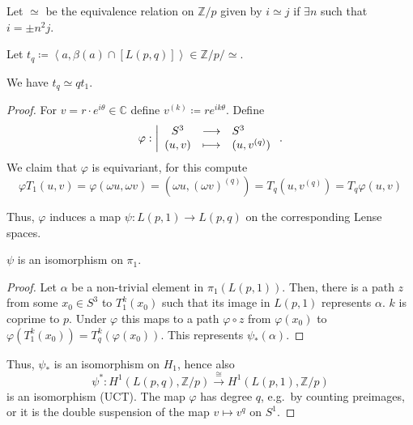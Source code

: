 
Let $\simeq$ be the equivalence relation on $\mathbb{Z}/p$ given by
$i \simeq j$ if $\exists n$ such that $i = \pm n^2 j$.

Let $t_q \coloneqq \left< a, β(a) \cap [L(p,q)] \right> \in \mathbb{Z}/p / \simeq$.

\begin{lemma}
  \label{lm:relation-lense-spaces-t-q-is-q-times-t-1}
  We have $t_q \simeq q t_1$.
\end{lemma}

\begin{proof}
  For $v = r\cdot e^{i\theta} \in \mathbb{C}$ define
  $v^{(k)} \coloneqq re^{ik\theta}$.
  Define
    \begin{equation*}
    \varphi : \left| \begin{array}{c c l} 
    S^3 & \longrightarrow & S^3 \\
    (u,v) & \longmapsto &  (u, v^{(q)})
    \end{array} \right.
    .
  \end{equation*}
  We claim that $\varphi $ is equivariant, for this compute
  \[
    \varphi T_1(u,v) = \varphi(\omega u, \omega v)
    =
    (\omega u, (\omega v)^{(q)})
    =
    T_q(u, v^{(q)})
    =
    T_q \varphi (u,v)
  \]

  Thus, $\varphi$ induces a map $\psi \colon  L(p,1) \to L(p,q)$
  on the corresponding Lense spaces.

  \begin{claim}
    $\psi $ is an isomorphism on $\pi_1$.
  \end{claim}
  \begin{proof}
    Let $α$ be a non-trivial element in $\pi_1(L(p,1))$.
    Then, there is a path $z$ from some $x_0\in S^3$ to
    $T_1^k(x_0)$ such that its image in $L(p,1)$
    represents $α$.
    $k$ is coprime to $p$.
    Under $\varphi $ this maps to a path $\varphi \circ z$
    from $\varphi (x_0)$ to $\varphi (T_1^k(x_0)) = T_q^k(\varphi (x_0))$.
    This represents $\psi _*(α)$.
  \end{proof}
  Thus, $\psi _*$ is an isomorphism on $H_1$,
  hence also
  \[
    \psi ^* \colon  H^1(L(p,q), \mathbb{Z}/p)
    \xrightarrow{\cong}
    H^1(L(p,1), \mathbb{Z}/p)
  \]
  is an isomorphism (UCT).
  The map $\varphi  $ has degree $q$,
  e.g.~by counting preimages, or it is the double suspension
  of the map $v \mapsto v^q$ on $S^1$.


\end{proof}
